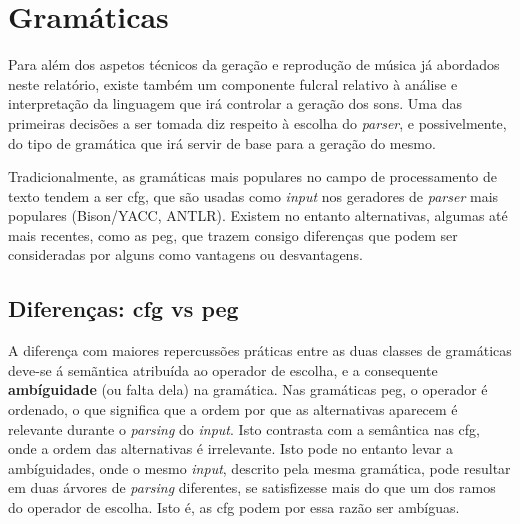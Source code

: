 \section{Gramáticas}


Para além dos aspetos técnicos da geração e reprodução de música já abordados neste relatório, existe também um componente fulcral relativo à análise e interpretação da linguagem que irá controlar a geração dos sons. Uma das primeiras decisões a ser tomada diz respeito à escolha do \textit{parser}, e possivelmente, do tipo de gramática que irá servir de base para a geração do mesmo.

Tradicionalmente, as gramáticas mais populares no campo de processamento de texto tendem a ser \acrfull{cfg}, que são usadas como \textit{input} nos geradores de \textit{parser} mais populares (Bison/YACC, ANTLR). Existem no entanto alternativas, algumas até mais recentes, como as \acrfull{peg}, que trazem consigo diferenças que podem ser consideradas por alguns como vantagens ou desvantagens.

\subsection{Diferenças: \acrshort{cfg} vs \acrshort{peg}}

A diferença com maiores repercussões práticas entre as duas classes de gramáticas deve-se á semãntica atribuída ao operador de escolha, e a consequente \textbf{ambíguidade} (ou falta dela) na gramática. Nas gramáticas \acrshort{peg}, o operador é ordenado, o que significa que a ordem por que as alternativas aparecem é relevante durante o \textit{parsing} do \textit{input}. Isto contrasta com a semântica nas \acrshort{cfg}, onde a ordem das alternativas é irrelevante. Isto pode no entanto levar a ambíguidades, onde o mesmo \textit{input}, descrito pela mesma gramática, pode resultar em duas árvores de \textit{parsing} diferentes, se satisfizesse mais do que um dos ramos do operador de escolha. Isto é, as \acrshort{cfg} podem por essa razão ser ambíguas.

